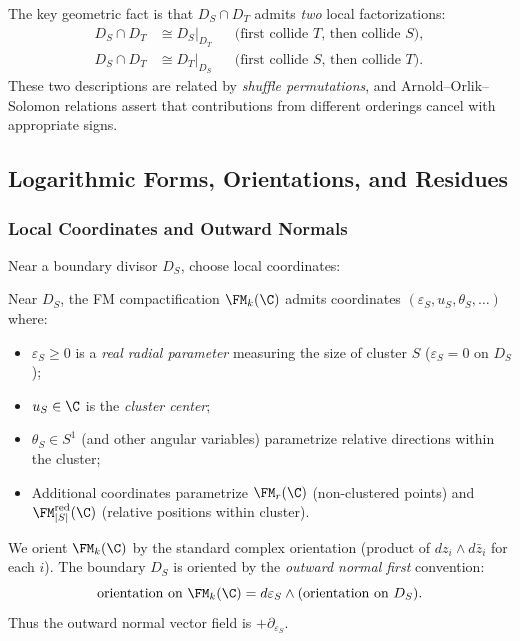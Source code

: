 The key geometric fact is that $D_S \cap D_T$ admits \emph{two} local factorizations:
\begin{align}
D_S \cap D_T &\cong D_S|_{D_T} && \text{(first collide $T$, then collide $S$)}, \\
D_S \cap D_T &\cong D_T|_{D_S} && \text{(first collide $S$, then collide $T$)}.
\end{align}
These two descriptions are related by \emph{shuffle permutations}, and Arnold--Orlik--Solomon relations assert that contributions from different orderings cancel with appropriate signs.

\subsection{Logarithmic Forms, Orientations, and Residues}

\subsubsection{Local Coordinates and Outward Normals}

Near a boundary divisor $D_S$, choose local coordinates:

\begin{definition}
\label{def:FM_coords}
Near $D_S$, the FM compactification $\FM_k(\C)$ admits coordinates $(\varepsilon_S, u_S, \theta_S, \ldots)$ where:
\begin{itemize}
\item $\varepsilon_S \geq 0$ is a \emph{real radial parameter} measuring the size of cluster $S$ ($\varepsilon_S = 0$ on $D_S$);
\item $u_S \in \C$ is the \emph{cluster center};
\item $\theta_S \in S^1$ (and other angular variables) parametrize relative directions within the cluster;
\item Additional coordinates parametrize $\FM_r(\C)$ (non-clustered points) and $\FM_{|S|}^{\mathrm{red}}(\C)$ (relative positions within cluster).
\end{itemize}
\end{definition}

\begin{definition}
\label{def:orientation}
We orient $\FM_k(\C)$ by the standard complex orientation (product of $dz_i \wedge d\bar{z}_i$ for each $i$). The boundary $D_S$ is oriented by the \emph{outward normal first} convention:
\[
\text{orientation on } \FM_k(\C) = d\varepsilon_S \wedge (\text{orientation on } D_S).
\]
Thus the outward normal vector field is $+\partial_{\varepsilon_S}$.
\end{definition}

